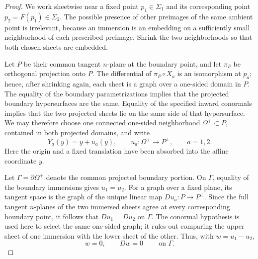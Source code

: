 \documentclass[10pt,a4paper]{amsart}
\begin{document}
\begin{proof}
We work sheetwise near a fixed point $p_1\in\Sigma_1$ and its corresponding
point $p_2=F(p_1)\in\Sigma_2$.  The possible presence of other preimages of
the same ambient point is irrelevant, because an immersion is an embedding on
a sufficiently small neighborhood of each prescribed preimage.  Shrink the
two neighborhoods so that both chosen sheets are embedded.

Let $P$ be their common tangent $n$-plane at the boundary point, and let
$\pi_P$ be orthogonal projection onto $P$.  The differential of
$\pi_P\circ X_a$ is an isomorphism at $p_a$; hence, after shrinking again,
each sheet is a graph over a one-sided domain in $P$.  The equality of the
boundary parametrizations implies that the projected boundary hypersurfaces
are the same.  Equality of the specified inward conormals implies that the two
projected sheets lie on the same side of that hypersurface.  We may therefore
choose one connected one-sided neighborhood $\Omega^+\subset P$, contained in
both projected domains, and write
\begin{equation}
        Y_a(y)=y+u_a(y),
        \qquad
        u_a:\Omega^+\longrightarrow P^\perp,
        \qquad a=1,2.
\end{equation}
Here the origin and a fixed translation have been absorbed into the affine
coordinate $y$.

Let $\Gamma=\partial\Omega^+$ denote the common projected boundary portion.
On $\Gamma$, equality of the boundary immersions gives $u_1=u_2$.  For a graph
over a fixed plane, its tangent space is the graph of the unique linear map
$Du_a:P\to P^\perp$.  Since the full tangent $n$-planes of the two immersed
sheets agree at every corresponding boundary point, it follows that
$Du_1=Du_2$ on $\Gamma$.  The conormal hypothesis is used here to select the
same one-sided graph; it rules out comparing the upper sheet of one immersion
with the lower sheet of the other.  Thus, with $w=u_1-u_2$,
\begin{equation}
        w=0,
        \qquad
        Dw=0
        \qquad\ \text{on }\Gamma.
\end{equation}


\end{proof}
\end{document}
